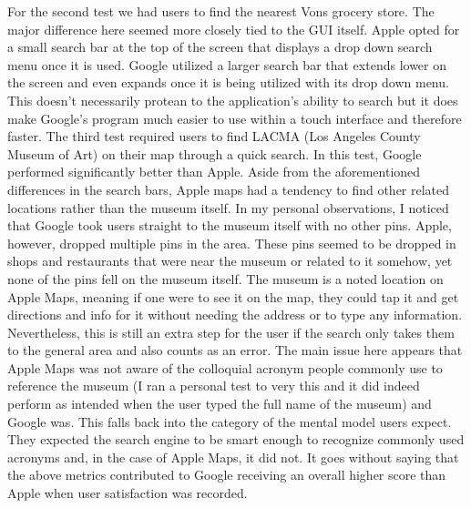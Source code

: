 	For the second test we had users to find the nearest Vons grocery store. The major difference here seemed more closely tied to the GUI itself. Apple opted for a small search bar at the top of the screen that displays a drop down search menu once it is used. Google utilized a larger search bar that extends lower on the screen and even expands once it is being utilized with its drop down menu. This doesn’t necessarily protean to  the application's ability to search but it does make Google's program much easier to use within a touch interface and therefore faster.
	The third test required users to find LACMA (Los Angeles County Museum of Art) on their map through a quick search. In this test, Google performed significantly better than Apple. Aside from the aforementioned differences in the search bars, Apple maps had a tendency to find other related locations rather than the museum itself. In my personal observations, I noticed that Google took users straight to the museum itself with no other pins. Apple, however, dropped multiple pins in the area. These pins seemed to be dropped in shops and restaurants that were near the museum or related to it somehow, yet none of the pins fell on the museum itself. The museum is a noted location on Apple Maps, meaning if one were to see it on the map, they could tap it and get directions and info for it without needing the address or to type any information. Nevertheless, this is still an extra step for the user if the search only takes them to the general area and also counts as an error. The main issue here appears that Apple Maps was not aware of the colloquial acronym people commonly use to reference the museum (I ran a personal test to very this and it did indeed perform as intended when the user typed the full name of the museum) and Google was. This falls back into the category of the mental model users expect. They expected the search engine to be smart enough to recognize commonly used acronyms and, in the case of Apple Maps, it did not. It goes without saying that the above metrics contributed to Google receiving an overall higher score than Apple when user satisfaction was recorded. 



